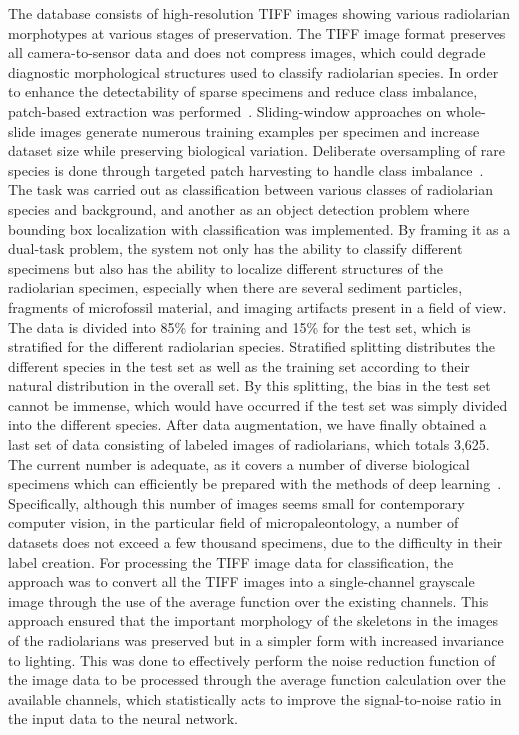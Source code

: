 \documentclass[a4paper,fleqn]{cas-sc}
\begin{document}
The database consists of high-resolution TIFF images showing various radiolarian morphotypes at various stages of preservation. The TIFF image format preserves all camera-to-sensor data and does not compress images, which could degrade diagnostic morphological structures used to classify radiolarian species. In order to enhance the detectability of sparse specimens and reduce class imbalance, patch-based extraction was performed~\cite{liu2023patch}. Sliding-window approaches on whole-slide images generate numerous training examples per specimen and increase dataset size while preserving biological variation. Deliberate oversampling of rare species is done through targeted patch harvesting to handle class imbalance~\cite{zhang2024class}.
The task was carried out as classification between various classes of radiolarian species and background, and another as an object detection problem where bounding box localization with classification was implemented. By framing it as a dual-task problem, the system not only has the ability to classify different specimens but also has the ability to localize different structures of the radiolarian specimen, especially when there are several sediment particles, fragments of microfossil material, and imaging artifacts present in a field of view.
The data is divided into 85\% for training and 15\% for the test set, which is stratified for the different radiolarian species. Stratified splitting distributes the different species in the test set as well as the training set according to their natural distribution in the overall set. By this splitting, the bias in the test set cannot be immense, which would have occurred if the test set was simply divided into the different species.
After data augmentation, we have finally obtained a last set of data consisting of labeled images of radiolarians, which totals 3,625. The current number is adequate, as it covers a number of diverse biological specimens which can efficiently be prepared with the methods of deep learning~\cite{hsiang2019machine}. Specifically, although this number of images seems small for contemporary computer vision, in the particular field of micropaleontology, a number of datasets does not exceed a few thousand specimens, due to the difficulty in their label creation.
For processing the TIFF image data for classification, the approach was to convert all the TIFF images into a single-channel grayscale image through the use of the average function over the existing channels. This approach ensured that the important morphology of the skeletons in the images of the radiolarians was preserved but in a simpler form with increased invariance to lighting. This was done to effectively perform the noise reduction function of the image data to be processed through the average function calculation over the available channels, which statistically acts to improve the signal-to-noise ratio in the input data to the neural network.
\end{document}
